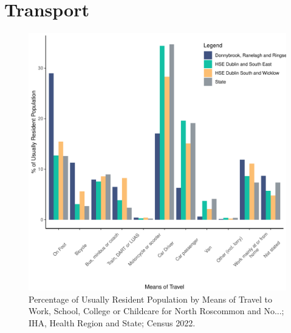 \documentclass{article}
\begin{document}
\section{Transport}\label{sect:Trans}
\begin{figure}[H]
	\centering
	\includegraphics[width = 120mm]{../figures/TravelED.pdf}
	\caption{Percentage of Usually Resident Population by Means of Travel to Work, School, College or Childcare for North Roscommon and No...; IHA, Health Region and State; Census 2022.}
	\label{fig:vbnv}
	\end{figure}
\end{document}
